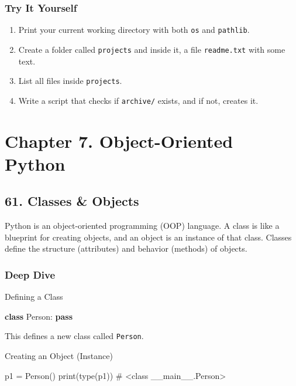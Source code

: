 \documentclass[
  letterpaper,
  DIV=11,
  numbers=noendperiod]{scrreprt}
\newenvironment{Shaded}{\begin{snugshade}}{\end{snugshade}}
\newcommand{\BuiltInTok}[1]{\textcolor[rgb]{0.00,0.23,0.31}{#1}}
\newcommand{\CommentTok}[1]{\textcolor[rgb]{0.37,0.37,0.37}{#1}}
\newcommand{\ControlFlowTok}[1]{\textcolor[rgb]{0.00,0.23,0.31}{\textbf{#1}}}
\newcommand{\KeywordTok}[1]{\textcolor[rgb]{0.00,0.23,0.31}{\textbf{#1}}}
\newcommand{\NormalTok}[1]{\textcolor[rgb]{0.00,0.23,0.31}{#1}}
\newcommand{\OperatorTok}[1]{\textcolor[rgb]{0.37,0.37,0.37}{#1}}
\providecommand{\tightlist}{%
  \setlength{\itemsep}{0pt}\setlength{\parskip}{0pt}}
\begin{document}
\subsubsection{Try It Yourself}\label{try-it-yourself-59}

\begin{enumerate}
\def\labelenumi{\arabic{enumi}.}
\tightlist
\item
  Print your current working directory with both \texttt{os} and
  \texttt{pathlib}.
\item
  Create a folder called \texttt{projects} and inside it, a file
  \texttt{readme.txt} with some text.
\item
  List all files inside \texttt{projects}.
\item
  Write a script that checks if \texttt{archive/} exists, and if not,
  creates it.
\end{enumerate}

\section{Chapter 7. Object-Oriented
Python}\label{chapter-7.-object-oriented-python}

\subsection{61. Classes \& Objects}\label{classes-objects}

Python is an object-oriented programming (OOP) language. A class is like
a blueprint for creating objects, and an object is an instance of that
class. Classes define the structure (attributes) and behavior (methods)
of objects.

\subsubsection{Deep Dive}\label{deep-dive-60}

Defining a Class

\begin{Shaded}
\begin{Highlighting}[]
\KeywordTok{class}\NormalTok{ Person:}
    \ControlFlowTok{pass}
\end{Highlighting}
\end{Shaded}

This defines a new class called \texttt{Person}.

Creating an Object (Instance)

\begin{Shaded}
\begin{Highlighting}[]
\NormalTok{p1 }\OperatorTok{=}\NormalTok{ Person()}
\BuiltInTok{print}\NormalTok{(}\BuiltInTok{type}\NormalTok{(p1))   }\CommentTok{\# \textless{}class \textquotesingle{}\_\_main\_\_.Person\textquotesingle{}\textgreater{}}
\end{Highlighting}
\end{Shaded}
\end{document}
